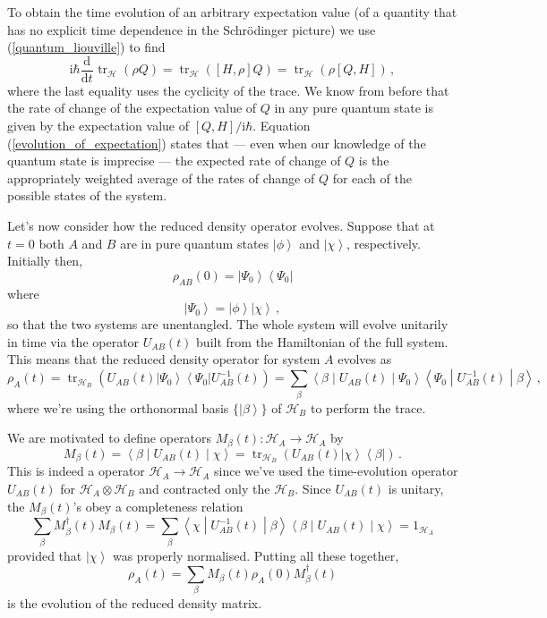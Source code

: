 \documentclass{article}
\theoremstyle{plain}\theoremheaderfont{\normalfont\itshape}\theorembodyfont{\rmfamily}\theoremseparator{.}\newtheorem*{rem}{Remark}\newtheorem*{ex}{Example}\newtheorem*{proof}{Proof}\newtheorem*{altp}{Alternative proof}
\theoremstyle{plain}\theoremheaderfont{\normalfont\bfseries}\theorembodyfont{\rmfamily}\theoremseparator{.}\newtheorem{thm}{Theorem}[section]\newtheorem{lem}[thm]{Lemma}\newtheorem{prop}[thm]{Proposition}\newtheorem*{cor}{Corollary}\newtheorem{defn}[thm]{Definition}\newtheorem{clm}[thm]{Claim}\newtheorem{clminproof}{Claim}
\theoremstyle{break}\theoremheaderfont{\normalfont\itshape}\theorembodyfont{\rmfamily}\theoremseparator{.\medskip}\newtheorem*{proofskip}{Proof}\newtheorem*{exs}{Examples}\newtheorem*{rems}{Remarks}
\theoremstyle{break}\theoremheaderfont{\normalfont\bfseries}\theorembodyfont{\rmfamily}\theoremseparator{.\medskip}\newtheorem{lemskip}[thm]{Lemma}\newtheorem{defnskip}[thm]{Definition}\newtheorem{propskip}[thm]{Proposition}\newtheorem{thmskip}[thm]{Theorem}
\numberwithin{equation}{section}
\newcommand{\ii}{\mathrm{i}}
\newcommand{\dv}[3][]{\frac{\mathrm{d}^{#1} #2}{{\mathrm{d} #3}^{#1}}}
\newcommand{\bra}[1]{\left\langle #1 \right|}
\newcommand{\ket}[1]{\left| #1 \right\rangle}
\newcommand{\mel}[3]{\left\langle #1 \middle| #2 \middle| #3 \right\rangle}
\newcommand{\hb}{\mathcal{H}}
\DeclareMathOperator{\tr}{tr}
\begin{document}
    To obtain the time evolution of an arbitrary expectation value (of a quantity that has no explicit time dependence in the Schr\"{o}dinger picture) we use (\ref{quantum_liouville}) to find
    \begin{equation}\label{evolution_of_expectation}
        \ii\hbar\dv{}{t}\tr_\hb (\rho Q)=\tr_\hb ([H,\rho]Q)=\tr_\hb(\rho[Q,H])\,,
    \end{equation}
    where the last equality uses the cyclicity of the trace. We know from before that the rate of change of the expectation value of \(Q\) in any pure quantum state is given by the expectation value of \([Q,H]/\ii\hbar\). Equation (\ref{evolution_of_expectation}) states that --- even when our knowledge of the quantum state is imprecise --- the expected rate of change of \(Q\) is the appropriately weighted average of the rates of change of \(Q\) for each of the possible states of the system.

    Let's now consider how the reduced density operator evolves. Suppose that at \(t=0\) both \(A\) and \(B\) are in pure quantum states \(\ket{\phi}\) and \(\ket{\chi}\), respectively. Initially then,
    \begin{equation}
        \rho_{AB}(0)=\ket{\Psi_0}\bra{\Psi_0}
    \end{equation}
    where
    \begin{equation}
        \ket{\Psi_0}=\ket{\phi}\ket{\chi}\,,
    \end{equation}
    so that the two systems are unentangled. The whole system will evolve unitarily in time via the operator \(U_{AB}(t)\) built from the Hamiltonian of the full system. This means that the reduced density operator for system \(A\) evolves as
    \begin{equation}
        \rho_A(t)=\tr_{\hb_B}(U_{AB}(t)\ket{\Psi_0}\bra{\Psi_0}U_{AB}^{-1}(t))=\sum_{\beta}\mel{\beta}{U_{AB}(t)}{\Psi_0}\mel{\Psi_0}{U_{AB}^{-1}(t)}{\beta}\,,
    \end{equation}
    where we're using the orthonormal basis \(\{\ket{\beta}\}\) of \(\hb_B\) to perform the trace.

    We are motivated to define operators \(M_\beta(t):\hb_A\to\hb_A\) by
    \begin{equation}
        M_\beta(t)=\mel{\beta}{U_{AB}(t)}{\chi}=\tr_{\hb_B}(U_{AB}(t)\ket{\chi}\bra{\beta})\,.
    \end{equation}
    This is indeed a operator \(\hb_A\to\hb_A\) since we've used the time-evolution operator \(U_{AB}(t)\) for \(\hb_A\otimes\hb_B\) and contracted only the \(\hb_B\). Since \(U_{AB}(t)\) is unitary, the \(M_\beta(t)\)'s obey a completeness relation
    \begin{equation}
        \sum_\beta M_\beta^\dagger(t) M_\beta(t)=\sum_\beta\mel{\chi}{U_{AB}^{-1}(t)}{\beta}\mel{\beta}{U_{AB}(t)}{\chi}=1_{\hb_A}
    \end{equation}
    provided that \(\ket{\chi}\) was properly normalised. Putting all these together,
    \begin{equation}
        \rho_A(t)=\sum_\beta M_\beta(t)\rho_A(0) M_\beta^\dagger(t)
    \end{equation}
    is the evolution of the reduced density matrix.
\end{document}
